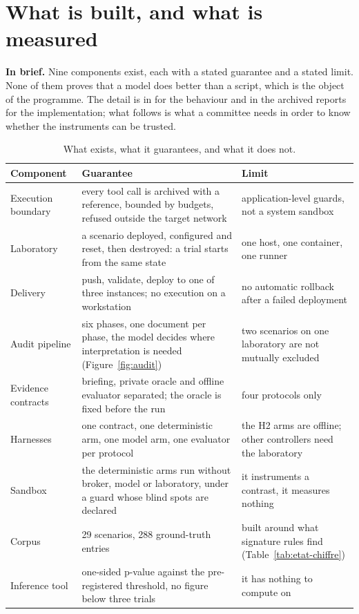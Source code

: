 \section{What is built, and what is measured}
\label{sec:construit}

\textbf{In brief.} Nine components exist, each with a stated guarantee and a
stated limit. None of them proves that a model does better than a script, which
is the object of the programme. The detail is in  for the behaviour
and in the archived reports for the implementation; what follows is what a
committee needs in order to know whether the instruments can be trusted.

\begin{table}[H]
\centering
\caption{What exists, what it guarantees, and what it does not.}
\label{tab:composants}
\small
\begin{tabularx}{\linewidth}{@{}p{3.2cm}Yp{3.5cm}@{}}
\toprule
Component & Guarantee & Limit \\
\midrule
Execution boundary & every tool call is archived with a reference, bounded by
budgets, refused outside the target network & application-level guards, not a
system sandbox \\
Laboratory & a scenario deployed, configured and reset, then destroyed: a trial
starts from the same state & one host, one container, one runner \\
Delivery & push, validate, deploy to one of three instances; no execution on a
workstation & no automatic rollback after a failed deployment \\
Audit pipeline & six phases, one document per phase, the model decides where
interpretation is needed (Figure~\ref{fig:audit}) & two scenarios on one
laboratory are not mutually excluded \\
Evidence contracts & briefing, private oracle and offline evaluator separated;
the oracle is fixed before the run & four protocols only \\
Harnesses & one contract, one deterministic arm, one model arm, one evaluator per
protocol & the H2 arms are offline; other controllers need the laboratory \\
Sandbox & the deterministic arms run without broker, model or laboratory, under a
guard whose blind spots are declared & it instruments a contrast, it measures
nothing \\
Corpus & 29 scenarios, 288 ground-truth entries & built around what signature
rules find (Table~\ref{tab:etat-chiffre}) \\
Inference tool & one-sided p-value against the pre-registered threshold, no
figure below three trials & it has nothing to compute on \\
\bottomrule
\end{tabularx}
\end{table}


